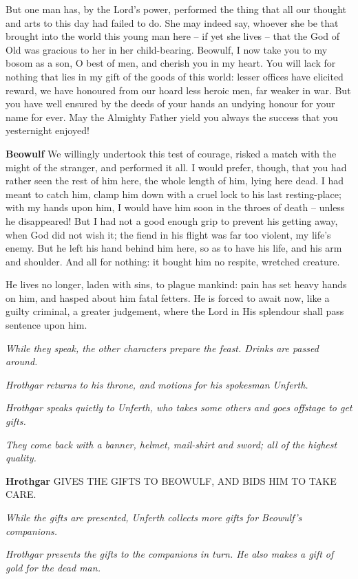 \documentclass[a4paper]{article}
\begin{document}
{But one man has,
by the Lord’s power, performed the thing
that all our thought and arts to this day
had failed to do. She may indeed say,
whoever she be that brought into the world
this young man here – if yet she lives –
that the God of Old was gracious to her
in her child-bearing. Beowulf, I now take you
to my bosom as a son, O best of men,
and cherish you in my heart. You will lack for nothing
that lies in my gift of the goods of this world:
lesser offices have elicited reward,
we have honoured from our hoard less heroic men,
far weaker in war. But you have well ensured
by the deeds of your hands an undying honour
for your name for ever. May the Almighty Father
yield you always the success that you yesternight enjoyed!

\textbf{Beowulf} We willingly undertook this test of courage,
risked a match with the might of the stranger,
and performed it all. I would prefer, though,
that you had rather seen the rest of him here,
the whole length of him, lying here dead.
I had meant to catch him, clamp him down
with a cruel lock to his last resting-place;
with my hands upon him, I would have him soon
in the throes of death – unless he disappeared!
But I had not a good enough grip to prevent
his getting away, when God did not wish it;
the fiend in his flight was far too violent,
my life’s enemy. But he left his hand
behind him here, so as to have his life,
and his arm and shoulder. And all for nothing:
it bought him no respite, wretched creature.

He lives no longer, laden with sins,
to plague mankind: pain has set
heavy hands on him, and hasped about him
fatal fetters. He is forced to await now,
like a guilty criminal, a greater judgement,
where the Lord in His splendour shall pass sentence upon him.

\centerline{\textit{While they speak, the other characters prepare the feast. Drinks are passed around.}}
\centerline{\textit{Hrothgar returns to his throne, and motions for his spokesman Unferth.}}

\centerline{\textit{Hrothgar speaks quietly to Unferth, who takes some others and goes offstage to get gifts.}}
\centerline{\textit{They come back with a banner, helmet, mail-shirt and sword; all of the highest quality.}}

\textbf{Hrothgar} GIVES THE GIFTS TO BEOWULF, AND BIDS HIM TO TAKE CARE.

\centerline{\textit{While the gifts are presented, Unferth collects more gifts for Beowulf's companions.}}
\centerline{\textit{Hrothgar presents the gifts to the companions in turn. He also makes a gift of gold for the dead man.}}

}
\end{document}
